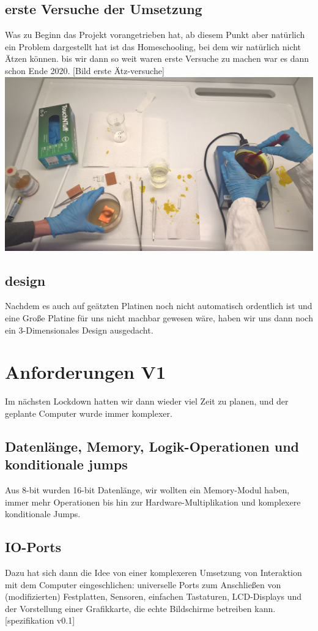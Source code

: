 \documentclass{scrartcl}
\begin{document}
    \subsection{erste Versuche der Umsetzung}
    Was zu Beginn das Projekt vorangetrieben hat, ab diesem Punkt aber natürlich ein Problem dargestellt hat ist das Homeschooling, bei dem wir natürlich nicht Ätzen können.
    bis wir dann so weit waren erste Versuche zu machen war es dann schon Ende 2020. [Bild erste Ätz-versuche]
    \includegraphics[width=\linewidth/2,angle=0]{Handy/WP_20210704_20_40_03_Pro} %

    \subsection{design}
    Nachdem es auch auf geätzten Platinen noch nicht automatisch ordentlich ist und eine Große Platine für uns nicht machbar gewesen wäre, haben wir uns dann noch ein 3-Dimensionales Design ausgedacht.

    \section{Anforderungen V1}
    Im nächsten Lockdown hatten wir dann wieder viel Zeit zu planen, und der geplante Computer wurde immer komplexer.
    \subsection{Datenlänge, Memory, Logik-Operationen und konditionale jumps}

    Aus 8-bit wurden 16-bit Datenlänge, wir wollten ein Memory-Modul haben, immer mehr Operationen bis hin zur Hardware-Multiplikation und komplexere konditionale Jumps.
    \subsection{IO-Ports}
    Dazu hat sich dann die Idee von einer komplexeren Umsetzung von Interaktion mit dem Computer eingeschlichen:
    universelle Ports zum Anschließen von (modifizierten) Festplatten, Sensoren, einfachen Tastaturen, LCD-Displays und der Vorstellung einer Grafikkarte, die echte Bildschirme betreiben kann.
    [spezifikation v0.1]
\end{document}
